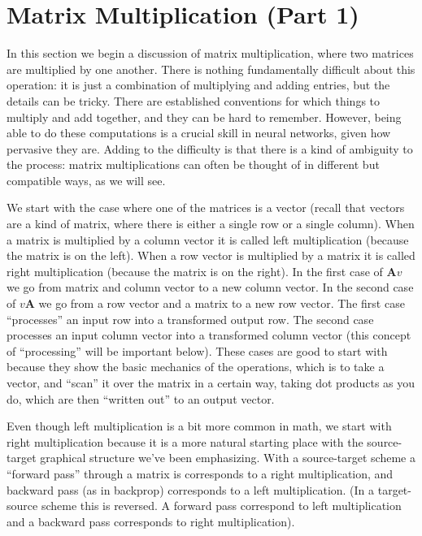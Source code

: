 \section{Matrix Multiplication (Part 1)}

In this section we begin a discussion of matrix multiplication, where two matrices are multiplied by one another. There is nothing fundamentally difficult about this operation: it is just a combination of multiplying and adding entries, but the details can be tricky. There are established conventions for which things to multiply and add together, and they can be hard to remember. However, being able to do these computations is a crucial skill in neural networks, given how pervasive they are. Adding to the difficulty is that there is a kind of ambiguity to the process: matrix multiplications can often be thought of in different but compatible ways, as we will see.

We start with the case where one of the matrices is a vector (recall that vectors are a kind of matrix, where there is either a single row or a single column). When a matrix is multiplied by a column vector it is called left multiplication (because the matrix is on the left). When a row vector is multiplied by a matrix it is called right multiplication (because the matrix is on the right). In the first case of $\mathbf{A}v$ we go from matrix and column vector to a new column vector. In the second case of $v\mathbf{A}$ we go from a row vector and a matrix to a new row vector.  The first case ``processes'' an input row into a transformed output row. The second case processes an input column vector into a transformed column vector (this concept of ``processing'' will be important below). These cases are good to start with because they show the basic mechanics of the operations, which is to take a vector, and ``scan'' it over the matrix in a certain way, taking dot products as you do, which are then ``written out'' to an output vector.  

Even though left multiplication is a bit more common in math, we start with right multiplication because it is a more natural starting place with the source-target graphical structure we've been emphasizing.  With a source-target scheme a  ``forward pass'' through a matrix is corresponds to a right multiplication, and backward pass (as in backprop) corresponds to a left multiplication. (In a target-source scheme this is reversed. A forward pass correspond to left multiplication and a backward pass corresponds to right multiplication).

